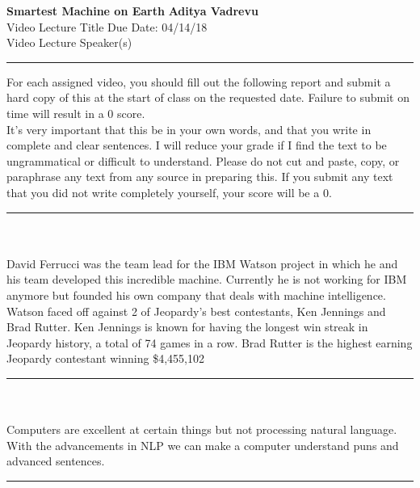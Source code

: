 \documentclass[a4paper, 11pt]{article}
\begin{document}
\noindent
\large\textbf{Smartest Machine on Earth} \hfill \textbf{Aditya Vadrevu} \\
Video Lecture Title \hfill Due Date: 04/14/18 \\
Video Lecture Speaker(s)\\

\noindent\rule{16cm}{0.4pt}

\noindent For each assigned video, you should fill out the following report and submit a hard copy of this at the start of class on the requested date.  Failure to submit on time will result in a 0 score.\\

\noindent It's very important that this be in your own words, and that you write in complete and clear sentences. I will reduce your grade if I find the text to be ungrammatical or difficult to understand. Please do not cut and paste, copy, or paraphrase any text from any source in preparing this. If you submit any text that you did not write completely yourself, your score will be a 0.\\


\noindent\rule{16cm}{0.4pt}\\
\\
David Ferrucci was the team lead for the IBM Watson project in which he and his team developed this incredible machine. Currently he is not working for IBM anymore but founded his own company that deals with machine intelligence. Watson faced off against 2 of Jeopardy's best contestants, Ken Jennings and Brad Rutter. Ken Jennings is known for having the longest win streak in Jeopardy history, a total of 74 games in a row. Brad Rutter is the highest earning Jeopardy contestant winning \$4,455,102

\noindent\rule{16cm}{0.4pt}\\
\\
Computers are excellent at certain things but not processing natural language. With the advancements in NLP we can make a computer understand puns and advanced sentences.

\noindent\rule{16cm}{0.4pt}\\
\end{document}
